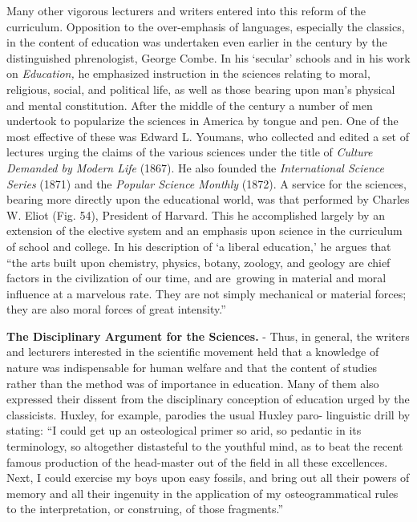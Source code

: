 \documentclass[
]{book}
\begin{document}
Many other vigorous lecturers and writers entered into this reform of the curriculum. Opposition to the over-emphasis of languages, especially the classics, in the content of education was undertaken even earlier in the century by the distinguished phrenologist, George Combe. In his `secular' schools and in his work on \emph{Education,} he emphasized instruction in the sciences relating to moral, religious, social, and political life, as well as those bearing upon man's physical and mental constitution. After the middle of the century a number of men undertook to popularize the sciences in America by tongue and pen. One of the most effective of these was Edward L. Youmans, who collected and edited a set of lectures urging the claims of the various sciences under the title of \emph{Culture Demanded by Modern Life} (1867). He also founded the \emph{International Science Series} (1871) and the \emph{Popular Science Monthly} (1872). A service for the sciences, bearing more directly upon the educational world, was that performed by Charles W. Eliot (Fig. 54), President of Harvard. This he accomplished largely by an extension of the elective system and an emphasis upon science in the curriculum of school and college. In his description of `a liberal education,' he argues that ``the arts built upon chemistry, physics, botany, zoology, and geology are chief factors in the civilization of our time, and are~growing in material and moral influence at a marvelous rate. They are not simply mechanical or material forces; they are also moral forces of great intensity.''

\textbf{The Disciplinary Argument for the Sciences.} - Thus, in general, the writers and lecturers interested in the scientific movement held that a knowledge of nature was indispensable for human welfare and that the content of studies rather than the method was of importance in education. Many of them also expressed their dissent from the disciplinary conception of education urged by the classicists. Huxley, for example, parodies the usual Huxley paro- linguistic drill by stating: ``I could get up an osteological primer so arid, so pedantic in its terminology, so altogether distasteful to the youthful mind, as to beat the recent famous production of the head-master out of the field in all these excellences. Next, I could exercise my boys upon easy fossils, and bring out all their powers of memory and all their ingenuity in the application of my osteogrammatical rules to the interpretation, or construing, of those fragments.''
\end{document}
